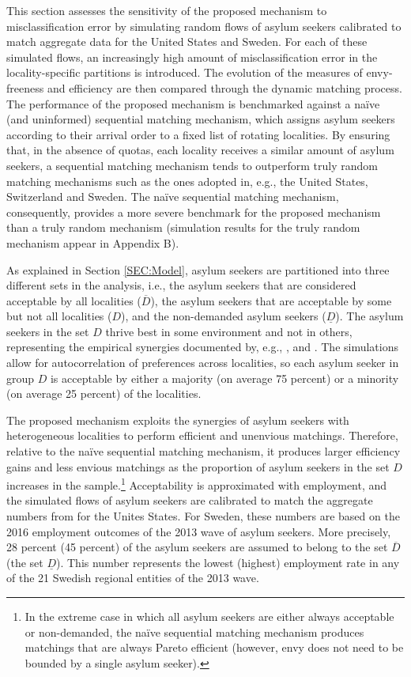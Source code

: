 \documentclass[12pt,fleqn]{article}
\begin{document}
This section assesses the sensitivity of the proposed mechanism to misclassification error by simulating random flows of asylum seekers calibrated to match aggregate data for the United States and Sweden. For each of these simulated flows, an increasingly high amount of misclassification error in the locality-specific partitions is introduced. The evolution of the measures of envy-freeness and efficiency are then compared through the dynamic matching process. The performance of the proposed mechanism is benchmarked against a na\"{i}ve (and uninformed) sequential matching mechanism, which assigns asylum seekers according to their arrival order to a fixed list of rotating localities. By ensuring that, in the absence of quotas, each locality receives a similar amount of asylum seekers, a sequential matching mechanism tends to outperform truly random matching mechanisms such as the ones adopted in, e.g., the United States, Switzerland and Sweden. The na\"{i}ve sequential matching mechanism, consequently, provides a more severe benchmark for the proposed mechanism than a truly random mechanism (simulation results for the truly random mechanism appear in Appendix B).

As explained in Section \ref{SEC:Model}, asylum seekers are partitioned into three different sets in the analysis, i.e., the asylum seekers that are considered acceptable by all localities ($\overline{D}$), the asylum seekers that are acceptable by some but not all localities ($D$), and the non-demanded asylum seekers ($\underline{D}$). The asylum seekers in the set $D$ thrive best in some environment and not in others, representing the empirical synergies documented by, e.g., \cite{bib:BansakEtAl}, \citet{bib:Damm} and \citet{bib:EdinEtAl}. The simulations allow for autocorrelation of preferences across localities, so each asylum seeker in group $D$ is acceptable by either a majority (on average 75 percent) or a minority (on average 25 percent) of the localities.

The proposed mechanism exploits the synergies of asylum seekers with heterogeneous localities to perform efficient and unenvious matchings. Therefore, relative to the na\"{i}ve sequential matching mechanism, it produces larger efficiency gains and less envious matchings as the proportion of asylum seekers in the set $D$ increases in the sample.\footnote{In the extreme case in which all asylum seekers are either always acceptable or non-demanded, the na\"{i}ve sequential matching mechanism produces matchings that are always Pareto efficient (however, envy does not need to be bounded by a single asylum seeker).} Acceptability is approximated with employment, and the simulated flows of asylum seekers are calibrated to match the aggregate numbers from \cite{bib:BansakEtAl} for the Unites States. For Sweden, these numbers are based on the 2016 employment outcomes of the 2013 wave of asylum seekers. More precisely, 28 percent (45 percent) of the asylum seekers are assumed to belong to the set $\overline{D}$ (the set $\underline{D}$). This number represents the lowest (highest) employment rate in any of the 21 Swedish regional entities of the 2013 wave.
\end{document}
